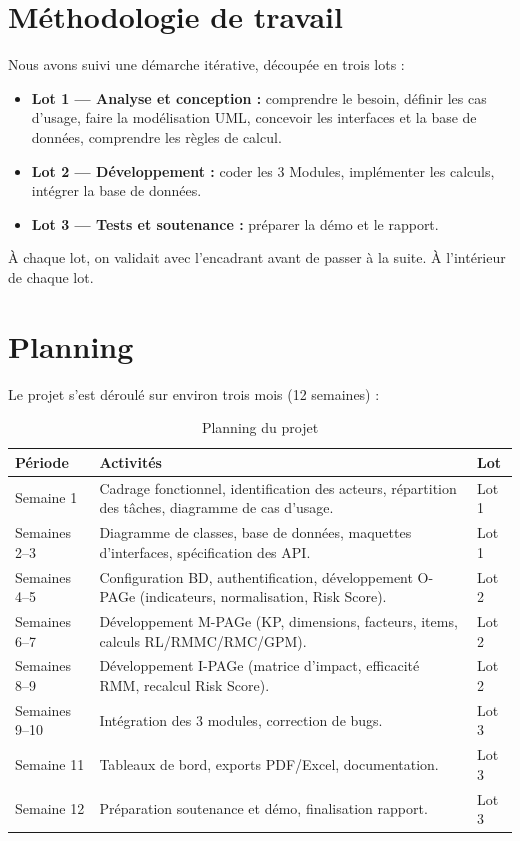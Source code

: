 \section{Méthodologie de travail}
Nous avons suivi une démarche itérative, découpée en trois lots :

\begin{itemize}
    \item \textbf{Lot 1 --- Analyse et conception :} comprendre le besoin, définir les cas d'usage, faire la modélisation UML, concevoir les interfaces et la base de données, comprendre les règles de calcul.
    \item \textbf{Lot 2 --- Développement :} coder les 3 Modules, implémenter les calculs, intégrer la base de données.
    \item \textbf{Lot 3 --- Tests et soutenance :} préparer la démo et le rapport.
\end{itemize}

À chaque lot, on validait avec l'encadrant avant de passer à la suite. À l'intérieur de chaque lot.
\section{Planning}
Le projet s'est déroulé sur environ trois mois (12 semaines) :

\begin{table}[h]
\centering
\renewcommand{\arraystretch}{1.3}
\begin{tabular}{@{}p{}p{}p{}@{}}
\hline
\textbf{Période} & \textbf{Activités} & \textbf{Lot} \\
\hline
Semaine 1 & Cadrage fonctionnel, identification des acteurs, répartition des tâches, diagramme de cas d'usage. & Lot 1 \\
\hline
Semaines 2--3 & Diagramme de classes, base de données, maquettes d'interfaces, spécification des API. & Lot 1 \\
\hline
Semaines 4--5 & Configuration BD, authentification, développement O-PAGe (indicateurs, normalisation, Risk Score). & Lot 2 \\
\hline
Semaines 6--7 & Développement M-PAGe (KP, dimensions, facteurs, items, calculs RL/RMMC/RMC/GPM). & Lot 2 \\
\hline
Semaines 8--9 & Développement I-PAGe (matrice d'impact, efficacité RMM, recalcul Risk Score). & Lot 2 \\
\hline
Semaines 9--10 & Intégration des 3 modules, correction de bugs. & Lot 3 \\
\hline
Semaine 11 & Tableaux de bord, exports PDF/Excel, documentation. & Lot 3 \\
\hline
Semaine 12 & Préparation soutenance et démo, finalisation rapport. & Lot 3 \\
\hline
\end{tabular}
\caption{Planning du projet}
\end{table}
\vspace{10cm}
